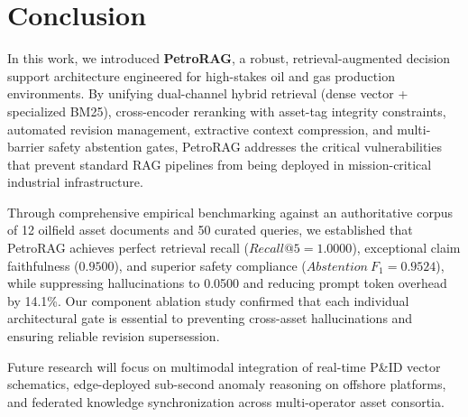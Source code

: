 \section{Conclusion}
\label{sec:conclusion}

In this work, we introduced \textbf{PetroRAG}, a robust, retrieval-augmented decision support architecture engineered for high-stakes oil and gas production environments. By unifying dual-channel hybrid retrieval (dense vector + specialized BM25), cross-encoder reranking with asset-tag integrity constraints, automated revision management, extractive context compression, and multi-barrier safety abstention gates, PetroRAG addresses the critical vulnerabilities that prevent standard RAG pipelines from being deployed in mission-critical industrial infrastructure.

Through comprehensive empirical benchmarking against an authoritative corpus of 12 oilfield asset documents and 50 curated queries, we established that PetroRAG achieves perfect retrieval recall ($Recall@5 = 1.0000$), exceptional claim faithfulness ($0.9500$), and superior safety compliance ($Abstention\ F_1 = 0.9524$), while suppressing hallucinations to 0.0500 and reducing prompt token overhead by 14.1\%. Our component ablation study confirmed that each individual architectural gate is essential to preventing cross-asset hallucinations and ensuring reliable revision supersession.

Future research will focus on multimodal integration of real-time P\&ID vector schematics, edge-deployed sub-second anomaly reasoning on offshore platforms, and federated knowledge synchronization across multi-operator asset consortia.
